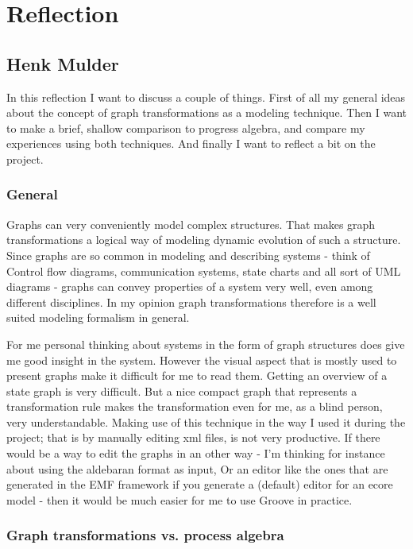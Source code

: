 \section{Reflection}
\label{Reflection}

\subsection{Henk Mulder}

In this reflection I want to discuss a couple of things.
First of all my general ideas about the concept of graph transformations as a modeling technique.
Then I want to make a brief, shallow comparison to progress algebra, and compare my experiences using both techniques.
And finally I want to reflect a bit on the project.

\subsubsection{General}
Graphs can very conveniently model complex structures. That makes graph transformations a logical way of modeling dynamic evolution of such a structure.
Since graphs are so common in modeling and describing systems - think of Control flow diagrams, communication systems, state charts and all sort of UML diagrams - graphs can convey properties of a system very well, even among different disciplines.
In my opinion graph transformations therefore is a well suited modeling formalism in general.

For me personal thinking about systems in the form of graph structures does give me good insight in the system. However the visual aspect that is mostly used to present graphs make it difficult for me to read them.
Getting an overview of a state graph is very difficult. But a nice compact graph that represents a transformation rule makes the transformation even for me, as a blind person, very understandable.
Making use of this technique in the way I used it during the project; that is by manually editing xml files, is not very productive. 
If there would be a way to edit the graphs in an other way - I'm thinking for instance about using the aldebaran format as input, Or an editor like the ones that are generated in the EMF framework if you generate a (default) editor for an ecore model - then it would be much easier for me to use Groove in practice.

\subsubsection{Graph transformations vs. process algebra}

